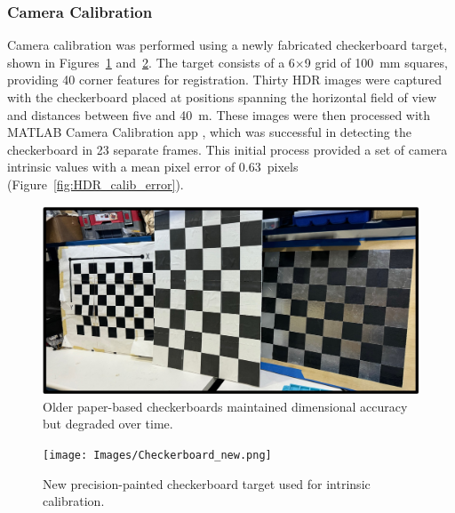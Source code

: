 \documentclass{erauthesis}
\begin{document}
\subsubsection{Camera Calibration} \label{sec:camera_intriniscs_results}

Camera calibration was performed using a newly fabricated checkerboard target, shown in Figures~\ref{fig:checkerboard_old} and~\ref{fig:checkerboard_new}.  
The target consists of a 6$\times$9 grid of 100~mm squares, providing 40 corner features for registration.  
Thirty HDR images were captured with the checkerboard placed at positions spanning the horizontal field of view and distances between five and 40~m.
These images were then processed with MATLAB Camera Calibration app \cite{matlab_calibration}, which was successful in detecting the checkerboard in 23 separate frames.  
This initial process provided a set of camera intrinsic values with a mean pixel error of 0.63~pixels (Figure~\ref{fig:HDR_calib_error}).

\begin{figure}[htbp]
    \centering
    \includegraphics[width=0.9\linewidth]{Images/checkerboard_old.jpg}
    \caption{Older paper-based checkerboards maintained dimensional accuracy but degraded over time.}
    \label{fig:checkerboard_old}
\end{figure}

\begin{figure}[htbp]
    \centering
    \texttt{[image: Images/Checkerboard\_new.png]}
    \caption{New precision-painted checkerboard target used for intrinsic calibration.}
    \label{fig:checkerboard_new}
\end{figure}
\end{document}
